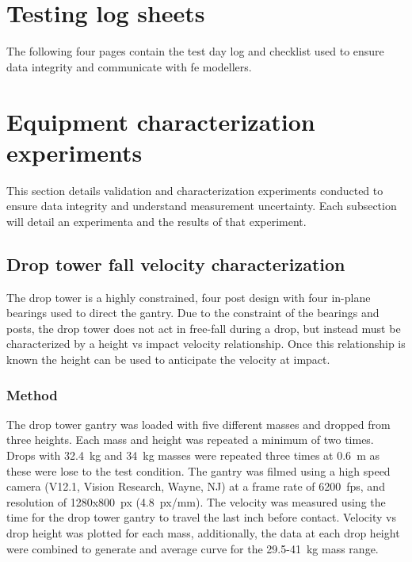 \section{Testing log sheets}
\label{sec:support_logsheets}
The following four pages contain the test day log and checklist used to ensure data integrity and communicate with \ac{fe} modellers.


\section{Equipment characterization experiments}
\label{sec:equipment}
This section details validation and characterization experiments conducted to ensure data integrity and understand measurement uncertainty.
Each subsection will detail an experimenta and the results of that experiment.

\subsection{Drop tower fall velocity characterization}
\label{sec:equipment_dt_velocity}
The drop tower is a highly constrained, four post design with four in-plane bearings used to direct the gantry.
Due to the constraint of the bearings and posts, the drop tower does not act in free-fall during a drop, but instead must be characterized by a height \ac{vs} impact velocity relationship.
Once this relationship is known the height can be used to anticipate the velocity at impact.

\subsubsection{Method}
The drop tower gantry was loaded with five different masses and dropped from three heights.
Each mass and height was repeated a minimum of two times.
Drops with 32.4~\ac{kg} and 34~\ac{kg} masses were repeated three times at 0.6~\ac{m} as these were lose to the test condition.
The gantry was filmed using a high speed camera (V12.1, Vision Research, Wayne, NJ) at a frame rate of 6200~\ac{fps}, and resolution of 1280x800~\ac{px} (4.8~\ac{px}/\ac{mm}).
The velocity was measured using the time for the drop tower gantry to travel the last inch before contact.
Velocity \ac{vs} drop height was plotted for each mass, additionally, the data at each drop height were combined to generate and average curve for the 29.5-41~\ac{kg} mass range.

